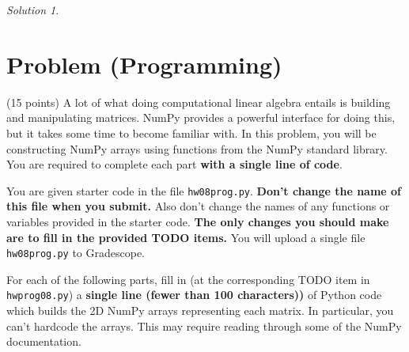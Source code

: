 \documentclass{article}
\theoremstyle{remark}
\newtheorem*{solution}{Solution}
\begin{document}
\medskip

\begin{solution}
\end{solution}

\pagebreak
\section{Problem (Programming)}

(15 points)
A lot of what doing computational linear algebra entails is building and manipulating matrices.
NumPy provides a powerful interface for doing this, but it takes some time to become familiar with.
In this problem, you will be constructing NumPy arrays using functions from the NumPy standard library.
You are required to complete each part \textbf{with a single line of code}.

You are given starter code in the file \texttt{hw08prog.py}.
\textbf{Don't change the name of this file when you submit.}
Also don't change the names of any functions or variables provided in the starter code.
\textbf{The only changes you should make are to fill in the provided TODO items.}
You will upload a single file \texttt{hw08prog.py} to Gradescope.

For each of the following parts, fill in (at the corresponding TODO item in \texttt{hwprog08.py}) a \textbf{single line (fewer than 100 characters))} of Python code which builds the 2D NumPy arrays representing each matrix.
In particular, you can't hardcode the arrays.
This may require reading through some of the NumPy documentation.
\end{document}
